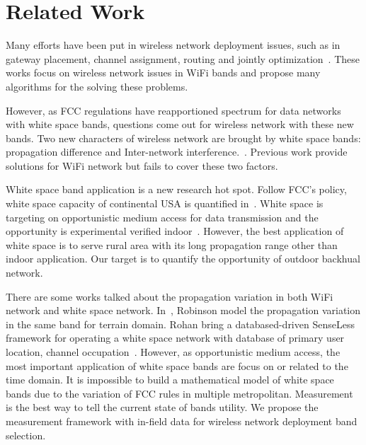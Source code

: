 \section{Related Work}
\label{sec:related}

Many efforts have been put in wireless network deployment issues, such as in gateway placement,
 channel assignment, routing and jointly optimization~\cite{he2008optimizing,ramachandran2006interference,akyildiz2006next}.
 These works focus on wireless network issues in WiFi bands and propose many algorithms 
 for the solving these problems.

However, as FCC regulations have reapportioned spectrum for data networks with white space bands, 
questions come out for wireless network with these new bands. Two new characters of wireless network
 are brought by white space bands: propagation difference and Inter-network interference.~\cite{cui2013leveraging,bahl2009white}.
 Previous work provide solutions for WiFi network but fails to cover these two factors.
 
 White space band application is a new research hot spot. Follow FCC's policy, white space capacity 
 of  continental USA is quantified in~\cite{harrison2010much}. White space is targeting on opportunistic 
  medium access for data transmission and the opportunity is experimental verified indoor~\cite{obregon2010experimental}.
  However, the best application of white space is to serve rural area with its long propagation range
   other than indoor application. Our target is to quantify the opportunity of outdoor backhual network.

There are some works talked about the propagation variation in both WiFi network and white space network.
In~\cite{robinson2010deploying}, Robinson model the propagation variation in the same band for terrain 
domain. Rohan bring a databased-driven SenseLess framework for operating a white space network with 
database of primary user location, channel occupation~\cite{murty2012senseless}. 
However, as opportunistic medium access, the most important application of white space bands are 
focus on or related to the time domain. It is impossible to build a mathematical model of white 
space bands due to the variation of FCC rules 
in multiple metropolitan. Measurement is the best way to tell the current state of bands utility.
We propose the measurement framework with in-field data for wireless network deployment band selection.


 



